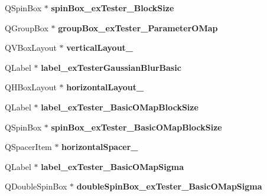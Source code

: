 \begin{DoxyCompactItemize}
\item 
\mbox{\label{class_ui___main_window_a1a6e2f6991b62613e8c04700e09793d4}} 
Q\+Spin\+Box $\ast$ {\bfseries spin\+Box\+\_\+ex\+Tester\+\_\+\+Block\+Size}
\item 
\mbox{\label{class_ui___main_window_a11522731b5ccdd9380ad581954e69403}} 
Q\+Group\+Box $\ast$ {\bfseries group\+Box\+\_\+ex\+Tester\+\_\+\+Parameter\+O\+Map}
\item 
\mbox{\label{class_ui___main_window_a00aef90ab49fd3caa34734b36707d9b6}} 
Q\+V\+Box\+Layout $\ast$ {\bfseries vertical\+Layout\+\_}
\item 
\mbox{\label{class_ui___main_window_a9287e261673b2c09df85be5fa3819a24}} 
Q\+Label $\ast$ {\bfseries label\+\_\+ex\+Tester\+Gaussian\+Blur\+Basic}
\item 
\mbox{\label{class_ui___main_window_a801412ee7430cd8ba763b6925da8f85f}} 
Q\+H\+Box\+Layout $\ast$ {\bfseries horizontal\+Layout\+\_}
\item 
\mbox{\label{class_ui___main_window_a9dd136b435a88c4d632b555670ef4fe9}} 
Q\+Label $\ast$ {\bfseries label\+\_\+ex\+Tester\+\_\+\+Basic\+O\+Map\+Block\+Size}
\item 
\mbox{\label{class_ui___main_window_ac5f1511b743d18487936d89f79f06b8a}} 
Q\+Spin\+Box $\ast$ {\bfseries spin\+Box\+\_\+ex\+Tester\+\_\+\+Basic\+O\+Map\+Block\+Size}
\item 
\mbox{\label{class_ui___main_window_a60fa81e0d62b9ecf1be9682ca551cef4}} 
Q\+Spacer\+Item $\ast$ {\bfseries horizontal\+Spacer\+\_}
\item 
\mbox{\label{class_ui___main_window_aa21d81819f772bb9f04e0f2816bfa5d5}} 
Q\+Label $\ast$ {\bfseries label\+\_\+ex\+Tester\+\_\+\+Basic\+O\+Map\+Sigma}
\item 
\mbox{\label{class_ui___main_window_a29a9cc445388579bef95c1549d197e25}} 
Q\+Double\+Spin\+Box $\ast$ {\bfseries double\+Spin\+Box\+\_\+ex\+Tester\+\_\+\+Basic\+O\+Map\+Sigma}

\end{DoxyCompactItemize}
